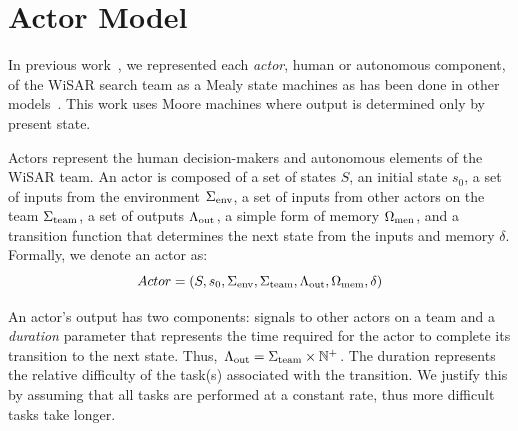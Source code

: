 \section{Actor Model} 

In previous work~\cite{gledhill2013modelinguas}, we represented each {\em actor}, human or autonomous component, of the WiSAR search team as a Mealy state machines as has been done in other models~\cite{bolton2013litreview}. This work uses Moore machines where output is determined only by present state.

Actors represent the human decision-makers and autonomous elements of the WiSAR team.  An actor is composed of a set of states $S$, an initial state $s_0$, a set of inputs from the environment $\Sigma_{\rm env}$, a set of inputs from other actors on the team $\Sigma_{\rm team}$, a set of outputs $\Lambda_{\rm out}$, a simple form of memory $\Omega_{\rm men}$, and a transition function that determines the next state from the inputs and memory $\delta$. Formally, we denote an actor as:
\begin{equation}
 	Actor = (S, s_0, \Sigma_{\rm env}, \Sigma_{\rm team}, \Lambda_{\rm out}, \Omega_{\rm mem},\delta)
 \label{eq:actor}
 \end{equation}

 An actor's output has two components: signals to other actors on a team and a {\em duration} parameter that represents the time required for the actor to complete its transition to the next state.  Thus, $\Lambda_{\rm out}=\Sigma_{\rm team} \times \mathbb{N}^+$. The duration represents the relative difficulty of the
task(s) associated with the transition.  We justify this by assuming that
all tasks are performed at a constant rate, thus more difficult tasks take
longer.
 
